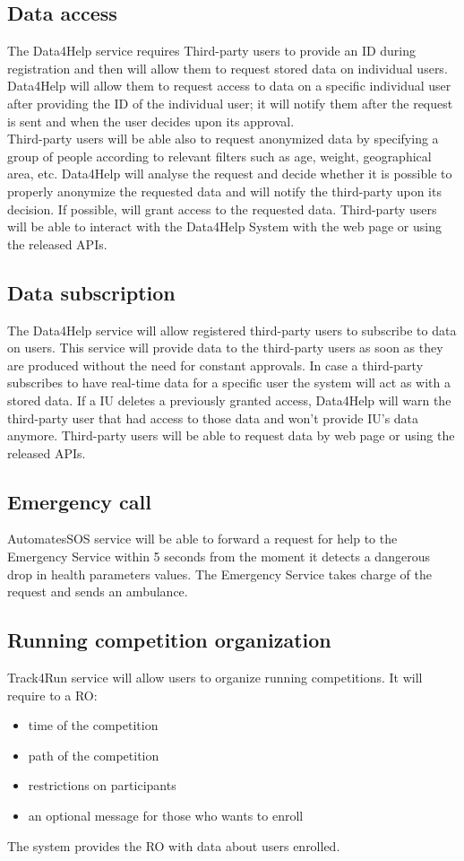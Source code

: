 \subsection{Data access}
The Data4Help service requires Third-party users to provide an ID during registration and then will allow them to request stored data on individual users. Data4Help will allow them to request access to data on a specific individual user after providing the ID of the individual user; it will notify them after the request is sent and when the user decides upon its approval. \\
Third-party users will be able also to request anonymized data by specifying a group of people according to relevant filters such as age, weight, geographical area, etc. 
Data4Help will analyse the request and decide whether it is possible to properly anonymize the requested data and will notify the third-party upon its decision. If possible, will grant access to the requested data. Third-party users will be able to interact with the Data4Help System with the web page or using the released APIs.
\subsection{Data subscription}
The Data4Help service will allow registered third-party users to subscribe to data on users. This service will provide data to the third-party users as soon as they are produced without the need for constant approvals.
In case a third-party subscribes to have real-time data for a specific user the system will act as with a stored data. If a IU deletes a previously granted access, Data4Help will warn the third-party user that had access to those data and won't provide IU's data anymore. Third-party users will be able to request data by web page or using the released APIs.
\\
\subsection{Emergency call}
AutomatesSOS service will be able to forward a request for help to the Emergency Service within 5 seconds from the moment it detects a dangerous drop in health parameters values. The Emergency Service takes charge of the request and sends an ambulance. 
\\
\subsection{Running competition organization}
Track4Run service will allow users to organize running competitions. It will require to a RO: 
\begin{itemize}
\item time of the competition
\item path of the competition
\item restrictions on participants 
\item an optional message for those who wants to enroll 
\end{itemize}
The system provides the RO with data about users enrolled.
